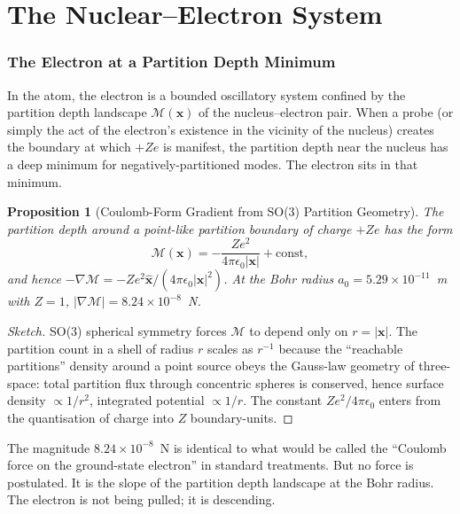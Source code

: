 \documentclass[11pt,a4paper]{article}
\newtheorem{proposition}[theorem]{Proposition}
\theoremstyle{definition}
\theoremstyle{remark}
\newcommand{\Depth}{\mathcal{M}}
\begin{document}
\part{The Nuclear--Electron System}

\section{The Electron at a Partition Depth Minimum}
\label{sec:electron}

In the atom, the electron is a bounded oscillatory system confined by the partition depth landscape $\Depth(\mathbf{x})$ of the nucleus--electron pair. When a probe (or simply the act of the electron's existence in the vicinity of the nucleus) creates the boundary at which $+Ze$ is manifest, the partition depth near the nucleus has a deep minimum for negatively-partitioned modes. The electron sits in that minimum.

\begin{proposition}[Coulomb-Form Gradient from SO(3) Partition Geometry]
\label{prop:coul}
The partition depth around a point-like partition boundary of charge $+Ze$ has the form
\[
\Depth(\mathbf{x}) = -\frac{Ze^2}{4\pi\epsilon_0 |\mathbf{x}|} + \text{const},
\]
and hence $-\nabla\Depth = -Ze^2\hat{\mathbf{x}}/(4\pi\epsilon_0 |\mathbf{x}|^2)$. At the Bohr radius $a_0 = 5.29\times 10^{-11}$~m with $Z=1$, $|\nabla\Depth| = 8.24\times 10^{-8}$~N.
\end{proposition}

\begin{proof}[Sketch]
SO(3) spherical symmetry forces $\Depth$ to depend only on $r = |\mathbf{x}|$. The partition count in a shell of radius $r$ scales as $r^{-1}$ because the ``reachable partitions'' density around a point source obeys the Gauss-law geometry of three-space: total partition flux through concentric spheres is conserved, hence surface density $\propto 1/r^2$, integrated potential $\propto 1/r$. The constant $Ze^2/4\pi\epsilon_0$ enters from the quantisation of charge into $Z$ boundary-units.
\end{proof}

The magnitude $8.24\times 10^{-8}$~N is identical to what would be called the ``Coulomb force on the ground-state electron'' in standard treatments. But no force is postulated. It is the slope of the partition depth landscape at the Bohr radius. The electron is not being pulled; it is descending.
\end{document}
